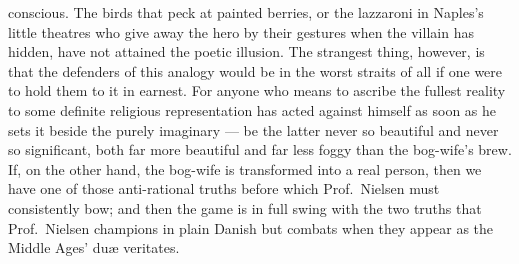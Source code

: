 \documentclass[12pt,a4paper]{book}
\begin{document}
conscious. The birds that peck at painted berries, or the lazzaroni in Naples's
little theatres who give away the hero by their gestures when the villain has
hidden, have not attained the poetic illusion. The strangest thing, however, is
that the defenders of this analogy would be in the worst straits of all if one
were to hold them to it in earnest. For anyone who means to ascribe the fullest
reality to some definite religious representation has acted against himself as
soon as he sets it beside the purely imaginary --- be the latter never so
beautiful and never so significant, both far more beautiful and far less foggy
than the bog-wife's brew. If, on the other hand, the bog-wife is transformed
into a real person, then we have one of those anti-rational truths before which
Prof.\ Nielsen must consistently bow; and then the game is in full swing with
the two truths that Prof.\ Nielsen champions in plain Danish but combats when
they appear as the Middle Ages' duæ veritates.
\end{document}
